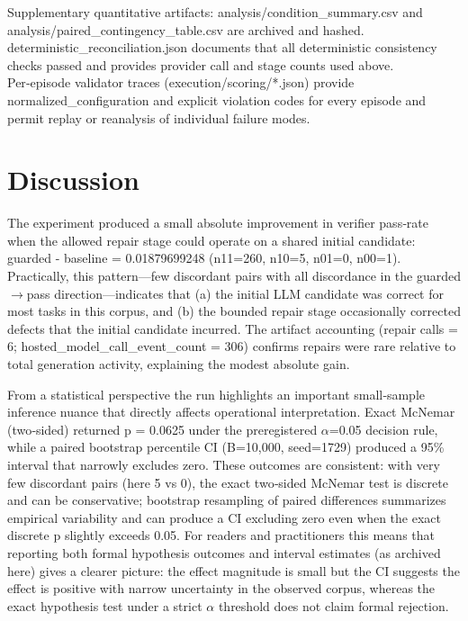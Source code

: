 \documentclass[conference]{IEEEtran}
\begin{document}
Supplementary quantitative artifacts: analysis/condition\_summary.csv and analysis/paired\_contingency\_table.csv are archived and hashed. deterministic\_reconciliation.json documents that all deterministic consistency checks passed and provides provider call and stage counts used above. Per‑episode validator traces (execution/scoring/*.json) provide normalized\_configuration and explicit violation codes for every episode and permit replay or reanalysis of individual failure modes.

\section{Discussion}
The experiment produced a small absolute improvement in verifier pass‑rate when the allowed repair stage could operate on a shared initial candidate: guarded - baseline = 0.01879699248 (n11=260, n10=5, n01=0, n00=1). Practically, this pattern---few discordant pairs with all discordance in the guarded\ensuremath{\rightarrow}pass direction---indicates that (a) the initial LLM candidate was correct for most tasks in this corpus, and (b) the bounded repair stage occasionally corrected defects that the initial candidate incurred. The artifact accounting (repair calls = 6; hosted\_model\_call\_event\_count = 306) confirms repairs were rare relative to total generation activity, explaining the modest absolute gain.

From a statistical perspective the run highlights an important small‑sample inference nuance that directly affects operational interpretation. Exact McNemar (two‑sided) returned p = 0.0625 under the preregistered \ensuremath{\alpha}=0.05 decision rule, while a paired bootstrap percentile CI (B=10,000, seed=1729) produced a 95\% interval that narrowly excludes zero. These outcomes are consistent: with very few discordant pairs (here 5 vs 0), the exact two‑sided McNemar test is discrete and can be conservative; bootstrap resampling of paired differences summarizes empirical variability and can produce a CI excluding zero even when the exact discrete p slightly exceeds 0.05. For readers and practitioners this means that reporting both formal hypothesis outcomes and interval estimates (as archived here) gives a clearer picture: the effect magnitude is small but the CI suggests the effect is positive with narrow uncertainty in the observed corpus, whereas the exact hypothesis test under a strict \ensuremath{\alpha} threshold does not claim formal rejection.
\end{document}
